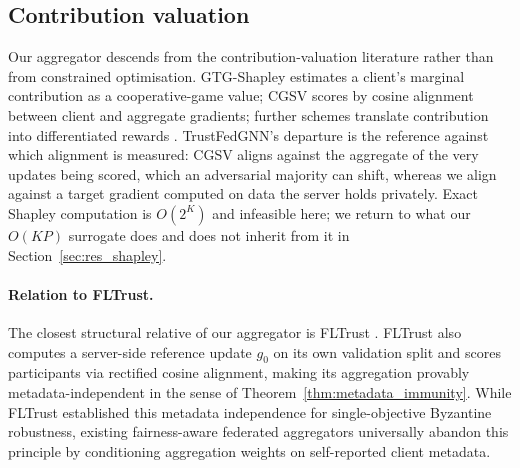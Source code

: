 \documentclass[preprint,12pt]{elsarticle}
\theoremstyle{plain}
\theoremstyle{definition}
\theoremstyle{remark}
\begin{document}
\subsection{Contribution valuation}
Our aggregator descends from the contribution-valuation literature rather than from constrained optimisation. GTG-Shapley \cite{liu2022gtg} estimates a client's marginal contribution as a cooperative-game value; CGSV \cite{xu2021gradient} scores by cosine alignment between client and aggregate gradients; further schemes translate contribution into differentiated rewards \cite{shi2024fedfaim,tastan2024redefining,lo2025fairwag,yu2026equfl}. TrustFedGNN's departure is the reference against which alignment is measured: CGSV aligns against the aggregate of the very updates being scored, which an adversarial majority can shift, whereas we align against a target gradient computed on data the server holds privately. Exact Shapley computation is $O(2^K)$ and infeasible here; we return to what our $O(KP)$ surrogate does and does not inherit from it in Section~\ref{sec:res_shapley}.

\paragraph{Relation to FLTrust.} The closest structural relative of our aggregator is FLTrust \cite{cao2021fltrust}. FLTrust also computes a server-side reference update $g_0$ on its own validation split and scores participants via rectified cosine alignment, making its aggregation provably metadata-independent in the sense of Theorem~\ref{thm:metadata_immunity}. While FLTrust established this metadata independence for single-objective Byzantine robustness, existing fairness-aware federated aggregators universally abandon this principle by conditioning aggregation weights on self-reported client metadata.
\end{document}
